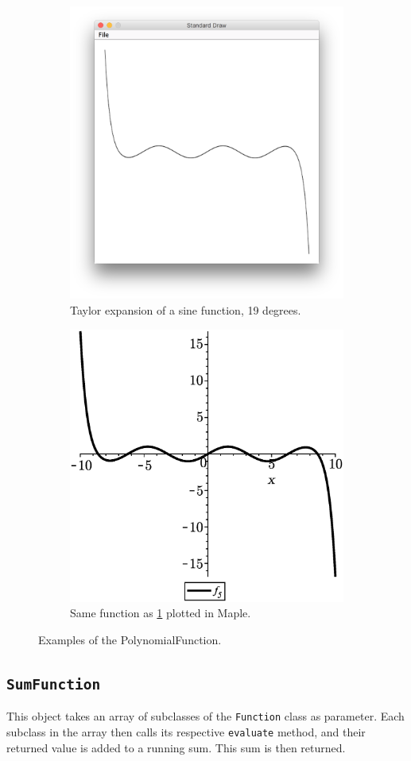 \begin{figure}[H]
\begin{subfigure}{0.5\textwidth}
        \includegraphics[width=0.7\linewidth]{GraphicalFunctionPlotter/fig/f5}
        \caption{Taylor expansion of a sine function, 19 degrees.}
        \label{fig:f5}
    \end{subfigure}
    \begin{subfigure}{0.5\textwidth}
        \centering
        \includegraphics[width=0.7\linewidth]{GraphicalFunctionPlotter/fig/f5Check}
        \caption{Same function as \ref{fig:f5} plotted in Maple.}
        \label{fig:f5Check}
    \end{subfigure}
    \caption{Examples of the PolynomialFunction.}
 \end{figure}


\subsection{\texttt{SumFunction}}
This object takes an array of subclasses of the \texttt{Function} class as parameter. Each subclass in the array then calls its respective \texttt{evaluate} method, and their returned value is added to a running sum. This sum is then returned.

